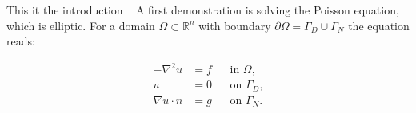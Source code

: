 \documentclass[master]{subfiles}
\begin{document}
This it the introduction ~\cite{Example}
A first demonstration is solving the Poisson equation, which is elliptic. For a domain 
$ \Omega \subset \mathbb{R}^n $ with boundary $\partial \Omega = \Gamma_{D} \cup \Gamma_{N}$ the equation reads:

\begin{align}
	 -\nabla^2 u &= f  && \text{in $\Omega$,} \\
	 u &= 0 && \text{on  $\Gamma_D$,} \\
	 \nabla u \cdot n &= g && \text{on $\Gamma_N$.}
\end{align}
\end{document}
